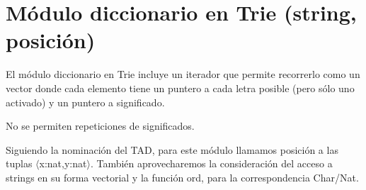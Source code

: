 \section{Módulo diccionario en Trie (string, posición)}

El módulo diccionario en Trie incluye un iterador que permite recorrerlo como un vector donde cada elemento tiene un puntero a cada letra posible (pero sólo uno activado) y un puntero a significado. \par 
No se permiten repeticiones de significados.\par
Siguiendo la nominación del TAD, para este módulo llamamos posición a las tuplas $\langle$x:nat,y:nat$\rangle$. También aprovecharemos la consideración del acceso a strings en su forma vectorial y la función ord, para la correspondencia Char/Nat.

